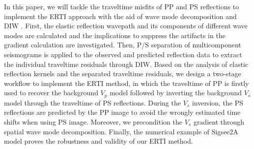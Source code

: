 


In this paper,   
we will tackle the traveltime misfits of PP and PS reflections to implement the ERTI
approach with the aid
of wave mode decomposition and DIW \cite[]{Hale2013}.
First, 
the elastic reflection wavepath and its components of different wave modes are
calculated and the implications to suppress the artifacts in the gradient calculation
are investigated.
Then, P/S separation of multicomponent seismograms is applied to the observed and predicted reflection data 
to extract the individual traveltime residuals through DIW. 
Based on the analysis of elastic reflection kernels and the separated traveltime residuals, 
we design a two-stage workflow to implement
the ERTI method,
in which the traveltime of PP is firstly used to recover the background
$V_p$ model followed by inverting the background $V_s$ model through the traveltime of PS
reflections.
During the $V_s$ inversion, the PS reflections are predicted by the PP image to avoid
the wrongly estimated time shifts when using PS image. Moreover, we precondition the $V_s$ gradient through spatial wave mode
decomposition.
Finally, the numerical example of Sigsee2A model proves the robustness and validity of our
ERTI method.
